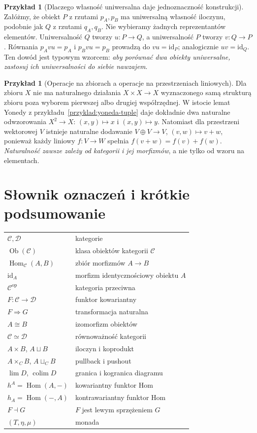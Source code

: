\documentclass[11pt,a4paper]{article}
\numberwithin{equation}{section}
\theoremstyle{plain}
\theoremstyle{definition}
\newtheorem{przyklad}[twierdzenie]{Przykład}
\theoremstyle{remark}
\newcommand{\id}{\mathrm{id}}
\newcommand{\Hom}{\operatorname{Hom}}
\newcommand{\Ob}{\operatorname{Ob}}
\newcommand{\op}{\mathrm{op}}
\newcommand{\colim}{\operatorname{colim}}
\begin{document}
\begin{przyklad}[Dlaczego własność uniwersalna daje jednoznaczność konstrukcji]
Załóżmy, że obiekt $P$ z rzutami $p_A,p_B$ ma uniwersalną własność iloczynu, podobnie jak $Q$ z rzutami $q_A,q_B$. Nie wybieramy żadnych reprezentantów elementów. Uniwersalność $Q$ tworzy $u:P\to Q$, a uniwersalność $P$ tworzy $v:Q\to P$. Równania $p_Avu=p_A$ i $p_Bvu=p_B$ prowadzą do $vu=\id_P$; analogicznie $uv=\id_Q$. Ten dowód jest typowym wzorcem: \emph{aby porównać dwa obiekty uniwersalne, zastosuj ich uniwersalności do siebie nawzajem}.
\end{przyklad}

\begin{przyklad}[Operacje na zbiorach a operacje na przestrzeniach liniowych]
Dla zbioru $X$ nie ma naturalnego działania $X\times X\to X$ wyznaczonego samą strukturą zbioru poza wyborem pierwszej albo drugiej współrzędnej. W istocie lemat Yonedy z przykładu~\ref{przyklad:yoneda-tuple} daje dokładnie dwa naturalne odwzorowania $X^2\to X$: $(x,y)\mapsto x$ i $(x,y)\mapsto y$. Natomiast dla przestrzeni wektorowej $V$ istnieje naturalne dodawanie $V\oplus V\to V$, $(v,w)\mapsto v+w$, ponieważ każdy liniowy $f:V\to W$ spełnia $f(v+w)=f(v)+f(w)$. \emph{Naturalność zawsze zależy od kategorii i jej morfizmów}, a nie tylko od wzoru na elementach.
\end{przyklad}


\section{Słownik oznaczeń i krótkie podsumowanie}\label{sec:slownik}

\begin{center}
\begin{tabular}{@{}ll@{}}
$\mathcal C,\mathcal D$ & kategorie \\
$\Ob(\mathcal C)$ & klasa obiektów kategorii $\mathcal C$ \\
$\Hom_{\mathcal C}(A,B)$ & zbiór morfizmów $A\to B$ \\
$\id_A$ & morfizm identycznościowy obiektu $A$ \\
$\mathcal C^{\op}$ & kategoria przeciwna \\
$F:\mathcal C\to\mathcal D$ & funktor kowariantny \\
$F\Rightarrow G$ & transformacja naturalna \\
$A\cong B$ & izomorfizm obiektów \\
$\mathcal C\simeq\mathcal D$ & równoważność kategorii \\
$A\times B$, $A\sqcup B$ & iloczyn i koprodukt \\
$A\times_C B$, $A\sqcup_C B$ & pullback i pushout \\
$\lim D$, $\colim D$ & granica i kogranica diagramu \\
$h^A=\Hom(A,-)$ & kowariantny funktor Hom \\
$h_A=\Hom(-,A)$ & kontrawariantny funktor Hom \\
$F\dashv G$ & $F$ jest lewym sprzężeniem $G$ \\
$(T,\eta,\mu)$ & monada \\
\end{tabular}
\end{center}
\end{document}

